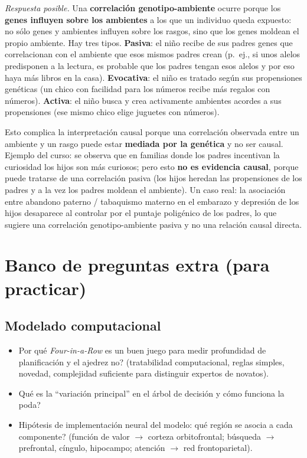 \documentclass[11pt, a4paper]{article}
\begin{document}
\begin{respuesta}
\textit{Respuesta posible.} Una \textbf{correlaci\'on genotipo-ambiente} ocurre porque los \textbf{genes influyen sobre los ambientes} a los que un individuo queda expuesto: no s\'olo genes y ambientes influyen sobre los rasgos, sino que los genes moldean el propio ambiente. Hay tres tipos. \textbf{Pasiva}: el ni\~no recibe de sus padres genes que correlacionan con el ambiente que esos mismos padres crean (p.\ ej., si unos alelos predisponen a la lectura, es probable que los padres tengan esos alelos y por eso haya m\'as libros en la casa). \textbf{Evocativa}: el ni\~no es tratado seg\'un sus propensiones gen\'eticas (un chico con facilidad para los n\'umeros recibe m\'as regalos con n\'umeros). \textbf{Activa}: el ni\~no busca y crea activamente ambientes acordes a sus propensiones (ese mismo chico elige juguetes con n\'umeros).

Esto complica la interpretaci\'on causal porque una correlaci\'on observada entre un ambiente y un rasgo puede estar \textbf{mediada por la gen\'etica} y no ser causal. Ejemplo del curso: se observa que en familias donde los padres incentivan la curiosidad los hijos son m\'as curiosos; pero esto \textbf{no es evidencia causal}, porque puede tratarse de una correlaci\'on pasiva (los hijos heredan las propensiones de los padres y a la vez los padres moldean el ambiente). Un caso real: la asociaci\'on entre abandono paterno / tabaquismo materno en el embarazo y depresi\'on de los hijos desaparece al controlar por el puntaje polig\'enico de los padres, lo que sugiere una correlaci\'on genotipo-ambiente pasiva y no una relaci\'on causal directa.
\end{respuesta}

\section{Banco de preguntas extra (para practicar)}

\subsection*{Modelado computacional}
\begin{itemize}[nosep]
    \item \textquestiondown Por qu\'e \textit{Four-in-a-Row} es un buen juego para medir profundidad de planificaci\'on y el ajedrez no? (tratabilidad computacional, reglas simples, novedad, complejidad suficiente para distinguir expertos de novatos).
    \item \textquestiondown Qu\'e es la ``variaci\'on principal'' en el \'arbol de decisi\'on y c\'omo funciona la poda?
    \item Hip\'otesis de implementaci\'on neural del modelo: \textquestiondown qu\'e regi\'on se asocia a cada componente? (funci\'on de valor $\to$ corteza orbitofrontal; b\'usqueda $\to$ prefrontal, c\'ingulo, hipocampo; atenci\'on $\to$ red frontoparietal).
\end{itemize}
\end{document}
